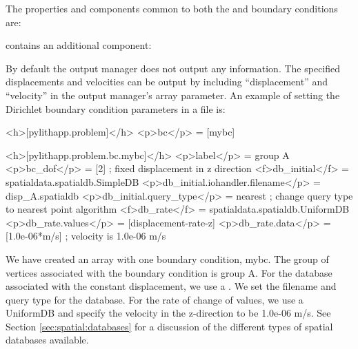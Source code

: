 The properties and components common to both the  and
 boundary conditions are:
\begin{inventory}
\end{inventory}
 contains an additional component:
\begin{inventory}
\end{inventory}
By default the output manager does not output any information. The
specified displacements and velocities can be output by including
``displacement'' and ``velocity'' in the output manager's 
array parameter. An example of setting the Dirichlet boundary condition
parameters in a  file is:
\begin{cfg}
<h>[pylithapp.problem]</h>
<p>bc</p> = [mybc]

<h>[pylithapp.problem.bc.mybc]</h>
<p>label</p> = group A 
<p>bc_dof</p> = [2] ; fixed displacement in z direction
<f>db_initial</f> = spatialdata.spatialdb.SimpleDB
<p>db_initial.iohandler.filename</p> = disp_A.spatialdb
<p>db_initial.query_type</p> = nearest ; change query type to nearest point algorithm
<f>db_rate</f> = spatialdata.spatialdb.UniformDB
<p>db_rate.values</p> = [displacement-rate-z]
<p>db_rate.data</p> = [1.0e-06*m/s] ; velocity is 1.0e-06 m/s
\end{cfg}
We have created an array with one boundary condition, mybc. The group
of vertices associated with the boundary condition is group A. For the
database associated with the constant displacement, we use a
.  We set the filename and query type for the
database. For the rate of change of values, we use a UniformDB and
specify the velocity in the z-direction to be 1.0e-06 m/s. See Section
\vref{sec:spatial:databases} for a discussion of the different types
of spatial databases available.


